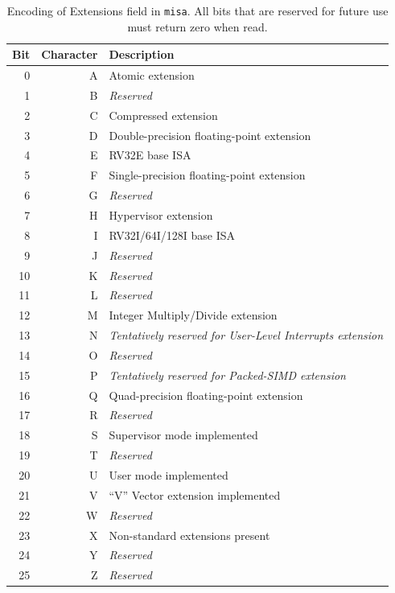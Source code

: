 \begin{table}
\begin{center}
\begin{tabular}{|r|r|l|}
\hline
Bit & Character  & Description \\
\hline
  0 & A & Atomic extension \\
  1 & B & {\em Reserved} \\
  2 & C & Compressed extension \\
  3 & D & Double-precision floating-point extension \\
  4 & E & RV32E base ISA \\
  5 & F & Single-precision floating-point extension \\
  6 & G & {\em Reserved} \\
  7 & H & Hypervisor extension \\
  8 & I & RV32I/64I/128I base ISA \\
  9 & J & {\em Reserved} \\
 10 & K & {\em Reserved} \\
 11 & L & {\em Reserved} \\
 12 & M & Integer Multiply/Divide extension \\
 13 & N & {\em Tentatively reserved for User-Level Interrupts extension} \\
 14 & O & {\em Reserved} \\
 15 & P & {\em Tentatively reserved for Packed-SIMD extension} \\
 16 & Q & Quad-precision floating-point extension \\
 17 & R & {\em Reserved} \\
 18 & S & Supervisor mode implemented \\
 19 & T & {\em Reserved} \\
 20 & U & User mode implemented \\
 21 & V & ``V'' Vector extension implemented \\
 22 & W & {\em Reserved} \\
 23 & X & Non-standard extensions present \\
 24 & Y & {\em Reserved} \\
 25 & Z & {\em Reserved} \\
\hline
\end{tabular}
\end{center}
\caption{Encoding of Extensions field in {\tt misa}.  All bits that are
  reserved for future use must return zero when read.}
\label{misaletters}
\end{table}



